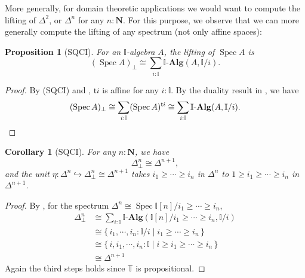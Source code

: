 \documentclass[12pt]{amsart}
\newtheorem{corollary}[theorem]{Corollary}
\newtheorem{proposition}[theorem]{Proposition}
\theoremstyle{definition}
\newtheorem*{axiom}{Axiom}
\newcommand{\mb}[1]{\mathbf{#1}}
\newcommand{\mbb}[1]{\mathbb{#1}}
\newcommand{\T}{\mbb T}
\newcommand{\I}{\mbb I}
\newcommand{\ms}[1]{\mathsf{#1}}
\newcommand{\alg}{\text{-}\mb{Alg}}
\newcommand{\scomp}[2]{\{\,#1\mid#2\,\}}
\newcommand{\hook}{\hookrightarrow}
\newcommand{\N}{\mb N}
\newcommand{\prt}{_{\bot}}
\newcommand{\spec}{\operatorname{Spec}}
\begin{document}
More generally, for domain theoretic applications we would want to compute the lifting of $\Delta^2$, or $\Delta^n$ for any $n:\N$. For this purpose, we observe that we can more generally compute the lifting of any spectrum (not only affine spaces):

\begin{proposition}[SQCI]\label{prop:liftofaffine}
  For an $\I$-algebra $A$, the lifting of $\spec A$ is
  \[ (\spec A)\prt \cong \sum_{i:\I}\I\alg(A,\I/i). \]
\end{proposition}
\begin{proof}
  By (SQCI) and , $\ms ti$ is affine for any $i:\I$. By the duality result in , we have
  \[ (\spec A)\prt \cong \sum_{i:\I}(\spec A)^{\ms ti}\cong \sum_{i:\I}\I\alg(A,\I/i). \qedhere \]
\end{proof}





\begin{corollary}[SQCI]
  For any $n : \N$, we have
  \[ \Delta^n\prt \cong \Delta^{n+1}, \]
  and the unit $\eta : \Delta^n \hook \Delta^n\prt \cong \Delta^{n+1}$ takes $i_1 \ge \cdots \ge i_n$ in $\Delta^n$ to $1 \ge i_1 \ge \cdots \ge i_n$ in $\Delta^{n+1}$. 
\end{corollary}
\begin{proof}
  By , for the spectrum $\Delta^n \cong \spec\I[n]/i_1 \ge \cdots \ge i_n$,
  \begin{align*}
    \Delta^n\prt 
    &\cong \sum_{i:\I}\I\alg(\I[n]/i_1\ge\cdots\ge i_n,\I/i) \\
    &\cong \scomp{i_1,\cdots,i_n:\I/i}{i_1 \ge \cdots \ge i_n} \\
    &\cong \scomp{i,i_1,\cdots,i_n:\I}{i \ge i_1 \ge \cdots \ge i_n} \\
    &\cong \Delta^{n+1}
  \end{align*}
  Again the third steps holds since $\T$ is propositional.
\end{proof}
\end{document}
